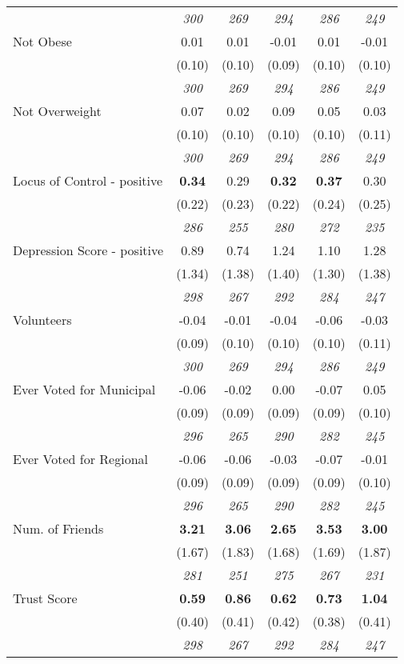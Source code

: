 \begin{tabular}{l c c c c c}
& \textit{ 300 } & \textit{ 269 } & \textit{ 294 } & \textit{ 286 } & \textit{ 249 } \\
Not Obese & 0.01 & 0.01 & -0.01 & 0.01 & -0.01 \\
& (0.10) & (0.10) & (0.09) & (0.10) & (0.10) \\
& \textit{ 300 } & \textit{ 269 } & \textit{ 294 } & \textit{ 286 } & \textit{ 249 } \\
Not Overweight & 0.07 & 0.02 & 0.09 & 0.05 & 0.03 \\
& (0.10) & (0.10) & (0.10) & (0.10) & (0.11) \\
& \textit{ 300 } & \textit{ 269 } & \textit{ 294 } & \textit{ 286 } & \textit{ 249 } \\
Locus of Control - positive & \textbf{ 0.34 } & 0.29 & \textbf{ 0.32 } & \textbf{ 0.37 } & 0.30 \\
& (0.22) & (0.23) & (0.22) & (0.24) & (0.25) \\
& \textit{ 286 } & \textit{ 255 } & \textit{ 280 } & \textit{ 272 } & \textit{ 235 } \\
Depression Score - positive & 0.89 & 0.74 & 1.24 & 1.10 & 1.28 \\
& (1.34) & (1.38) & (1.40) & (1.30) & (1.38) \\
& \textit{ 298 } & \textit{ 267 } & \textit{ 292 } & \textit{ 284 } & \textit{ 247 } \\
Volunteers & -0.04 & -0.01 & -0.04 & -0.06 & -0.03 \\
& (0.09) & (0.10) & (0.10) & (0.10) & (0.11) \\
& \textit{ 300 } & \textit{ 269 } & \textit{ 294 } & \textit{ 286 } & \textit{ 249 } \\
Ever Voted for Municipal & -0.06 & -0.02 & 0.00 & -0.07 & 0.05 \\
& (0.09) & (0.09) & (0.09) & (0.09) & (0.10) \\
& \textit{ 296 } & \textit{ 265 } & \textit{ 290 } & \textit{ 282 } & \textit{ 245 } \\
Ever Voted for Regional & -0.06 & -0.06 & -0.03 & -0.07 & -0.01 \\
& (0.09) & (0.09) & (0.09) & (0.09) & (0.10) \\
& \textit{ 296 } & \textit{ 265 } & \textit{ 290 } & \textit{ 282 } & \textit{ 245 } \\
Num. of Friends & \textbf{ 3.21 } & \textbf{ 3.06 } & \textbf{ 2.65 } & \textbf{ 3.53 } & \textbf{ 3.00 } \\
& (1.67) & (1.83) & (1.68) & (1.69) & (1.87) \\
& \textit{ 281 } & \textit{ 251 } & \textit{ 275 } & \textit{ 267 } & \textit{ 231 } \\
Trust Score & \textbf{ 0.59 } & \textbf{ 0.86 } & \textbf{ 0.62 } & \textbf{ 0.73 } & \textbf{ 1.04 } \\
& (0.40) & (0.41) & (0.42) & (0.38) & (0.41) \\
& \textit{ 298 } & \textit{ 267 } & \textit{ 292 } & \textit{ 284 } & \textit{ 247 } \\
\bottomrule
\end{tabular}
